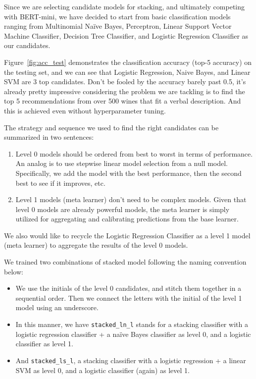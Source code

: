 \documentclass[
]{kaohandt}
\begin{document}
Since we are selecting candidate models for stacking, and ultimately competing with BERT-mini, we have decided to start from basic classification models ranging from Multinomial Naïve Bayes, Perceptron, Linear Support Vector Machine Classifier, Decision Tree Classifier, and Logistic Regression Classifier as our candidates.

Figure~\ref{fig:acc_test} demonstrates the classification accuracy (top-5 accuracy) on the testing set, and we can see that Logistic Regression, Naive Bayes, and Linear SVM are 3 top candidates. Don’t be fooled by the accuracy barely past 0.5, it’s already pretty impressive considering the problem we are tackling is to find the top 5 recommendations from over 500 wines that fit a verbal description. And this is achieved even without hyperparameter tuning.

The strategy and sequence we used to find the right candidates can be summarized in two sentences:

\begin{enumerate}
	\item Level 0 models should be ordered from best to worst in terms of performance. An analog is to use stepwise linear model selection from a null model. Specifically, we add the model with the best performance, then the second best to see if it improves, etc.
	\item Level 1 models (meta learner) don’t need to be complex models. Given that level 0 models are already powerful models, the meta learner is simply utilized for aggregating and calibrating predictions from the base learner.
\end{enumerate}

We also would like to recycle the Logistic Regression Classifier as a level 1 model (meta learner) to aggregate the results of the level 0 models.

We trained two combinations of stacked model following the naming convention below:

\begin{itemize}
	\item We use the initials of the level 0 candidates, and stitch them together in a sequential order. Then we connect the letters with the initial of the level 1 model using an underscore.
	\item In this manner, we have \texttt{stacked\_ln\_l} stands for a stacking classifier with a logistic regression classifier + a naïve Bayes classifier as level 0, and a logistic classifier as level 1.
	\item And \texttt{stacked\_ls\_l}, a stacking classifier with a logistic regression + a linear SVM as level 0, and a logistic classifier (again) as level 1.
\end{itemize}
\end{document}
